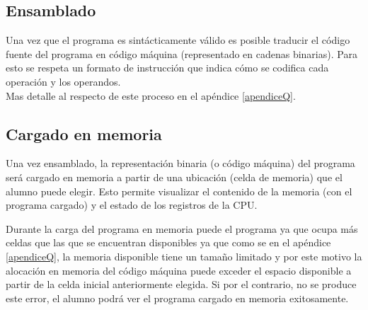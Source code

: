 \subsection{Ensamblado}

Una vez que el programa es sintácticamente válido es posible traducir el código fuente del programa en código máquina (representado en cadenas binarias). Para esto se respeta un formato de instrucción que indica cómo se codifica cada operación y los operandos. \\
Mas detalle al respecto de este proceso en el apéndice \ref{apendiceQ}.

\subsection{Cargado en memoria}

Una vez ensamblado, la representación binaria (o código máquina) del programa será cargado en memoria a partir de una ubicación (celda de memoria) que el alumno puede elegir. Esto permite visualizar el contenido de la memoria (con el programa cargado) y el estado de los registros de la CPU. 

Durante la carga del programa en memoria puede  el programa  ya que ocupa más celdas que las que se encuentran disponibles  ya que como se  en el apéndice \ref{apendiceQ}, la memoria disponible tiene un tamaño limitado y por este motivo la alocación en memoria del código máquina puede exceder el espacio disponible a partir de la celda inicial anteriormente elegida. Si por el contrario, no se produce este error, el alumno podrá ver el programa cargado en memoria exitosamente.

